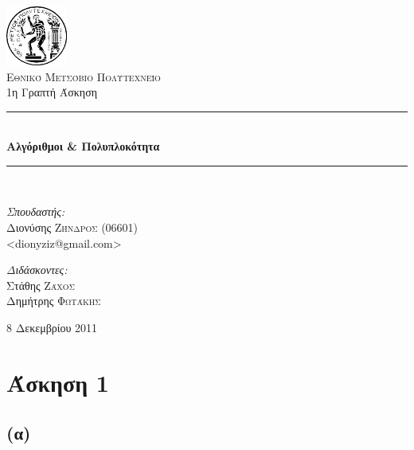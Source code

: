 \documentclass[11pt,a4paper]{book}
\newcommand{\HRule}{\rule{\linewidth}{0.5mm}}
\begin{document}
\begin{titlepage}
\begin{center}

\includegraphics[width=0.15\textwidth]{Pyrforos3.png}\\[1cm]
\textsc{\LARGE Εθνικό Μετσόβιο Πολυτεχνείο}\\[1.5cm]

\Large{ 1η Γραπτή Άσκηση }\\[0.5cm]

\begin{doublespace}
\HRule \\[0.4cm]
{\huge \bfseries
Αλγόριθμοι \& Πολυπλοκότητα
}\\[0.4cm]
\end{doublespace}

\HRule \\[1.5cm]

\begin{minipage}{0.4\textwidth}
\begin{flushleft} \large
\emph{Σπουδαστής:} \\
Διονύσης \textsc{Ζήνδρος} (06601)\\
\textlatin{\textless dionyziz@gmail.com\textgreater}
\end{flushleft}
\end{minipage}
\begin{minipage}{0.4\textwidth}
\begin{flushright} \large
\emph{Διδάσκοντες:} \\
Στάθης \textsc{Ζάχος}\\
Δημήτρης \textsc{Φωτάκης}
\end{flushright}
\end{minipage}

\vfill

{\large 8 Δεκεμβρίου 2011}
\end{center}
\end{titlepage}

\section*{Άσκηση 1}
\subsection*{(α)}
\end{document}
